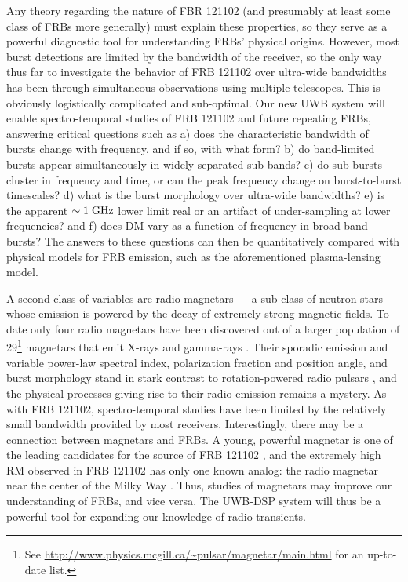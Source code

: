 \documentclass[10pt]{myNSF}
\begin{document}
Any theory regarding the nature of FBR 121102 (and presumably at least
some class of FRBs more generally) must explain these properties, so
they serve as a powerful diagnostic tool for understanding FRBs'
physical origins.  However, most burst detections are limited by the
bandwidth of the receiver, so the only way thus far to investigate the
behavior of FRB 121102 over ultra-wide bandwidths has been through
simultaneous observations using multiple telescopes.  This is
obviously logistically complicated and sub-optimal.  Our new UWB
system will enable spectro-temporal studies of FRB 121102 and future
repeating FRBs, answering critical questions such as a) does the
characteristic bandwidth of bursts change with frequency, and if so,
with what form? b) do band-limited bursts appear simultaneously in
widely separated sub-bands? c) do sub-bursts cluster in frequency and
time, or can the peak frequency change on burst-to-burst timescales?
d) what is the burst morphology over ultra-wide bandwidths? e) is the
apparent $\sim 1\; \textrm{GHz}$ lower limit real or an artifact of
under-sampling at lower frequencies? and f) does DM vary as a function
of frequency in broad-band bursts?  The answers to these questions can
then be quantitatively compared with physical models for FRB emission,
such as the aforementioned plasma-lensing model.

A second class of variables are radio magnetars --- a sub-class of
neutron stars whose emission is powered by the decay of extremely
strong magnetic fields.  To-date only four radio magnetars have been
discovered out of a larger population of 29\footnote{See
  \url{http://www.physics.mcgill.ca/~pulsar/magnetar/main.html} for an
  up-to-date list.} magnetars that emit X-rays and gamma-rays
\citep{crh+06,crh+07,lbb+10,efk+13}.  Their sporadic emission and
variable power-law spectral index, polarization fraction and position
angle, and burst morphology stand in stark contrast to
rotation-powered radio pulsars \citep[e.g.][]{crp+07}, and the
physical processes giving rise to their radio emission remains a
mystery.  As with FRB 121102, spectro-temporal studies have been
limited by the relatively small bandwidth provided by most receivers.
Interestingly, there may be a connection between magnetars and FRBs.
A young, powerful magnetar is one of the leading candidates for the
source of FRB 121102 \citep[e.g.][]{mm18}, and the extremely high RM
observed in FRB 121102 has only one known analog: the radio magnetar
near the center of the Milky Way \citep{efk+13}.  Thus, studies of
magnetars may improve our understanding of FRBs, and vice versa.  The
UWB-DSP system will thus be a powerful tool for expanding our
knowledge of radio transients.
\end{document}

